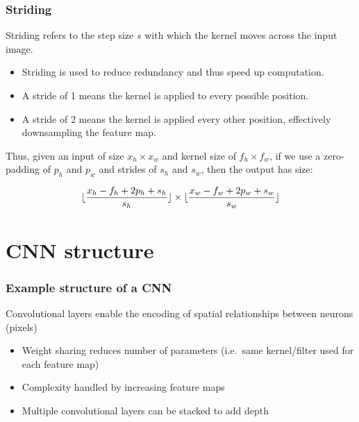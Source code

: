 \documentclass[smaller]{beamer}
\begin{document}
\begin{frame}
  \frametitle{Striding}\pause

  Striding refers to the step size $s$ with which the kernel moves across the input image. \pause
  \begin{itemize}[<+->]
    \item   Striding is used to reduce redundancy and thus speed up computation.
  \item A stride of 1 means the kernel is applied to every possible position.
  \item A stride of 2 means the kernel is applied every other position, effectively downsampling the feature map.
  \end{itemize}
  \pause
  Thus, given an input of size $x_h \times x_w$ and kernel size of $f_h \times f_w$, if we use a zero-padding of $p_h$ and $p_w$ and strides of $s_h$ and $s_w$, then the output has size:\pause

  \begin{equation}
    \lfloor \frac{x_h - f_h + 2p_h +s_h}{s_h}\rfloor \times \lfloor \frac{x_w - f_w + 2p_w +s_w}{s_w} \rfloor
  \end{equation}
\end{frame}


\section{CNN structure}
\begin{frame}
  \frametitle{Example structure of a CNN}\pause
  Convolutional layers enable the encoding of spatial relationships between neurons (pixels)\pause
  \begin{itemize}
  \item Weight sharing reduces number of parameters (i.e.\ same kernel/filter used for each feature map)\pause
  \item Complexity handled by increasing feature maps\pause
  \item Multiple convolutional layers can be stacked to add depth
  \end{itemize}
  \pause
\end{frame}
\end{document}
